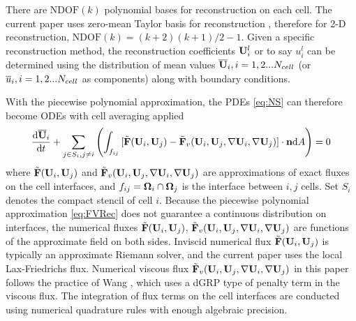 There are $\mathrm{NDOF}(k)$ polynomial bases for reconstruction on
each cell.
The current paper uses zero-mean Taylor basis
for reconstruction \cite{wang2017compact_VR}, therefore
for 2-D reconstruction, $\mathrm{NDOF}(k) = (k+2)(k+1)/2 -1$.
Given a specific reconstruction method,
the reconstruction coefficients $\mathbf{U}_i^l$ or to say $u_i^l$
can be determined using
the distribution of mean values $\overline{\mathbf{U}}_i, i=1,2...N_{cell}$
(or
$\overline{u}_i, i=1,2...N_{cell}$ as components)
along with boundary conditions.

With the piecewise polynomial approximation,
the PDEs \eqref{eq:NS} can therefore become ODEs
with cell averaging applied
\begin{equation}
    \label{eq:FVInt}
    \frac{\dd\overline{\mathbf{U}}_i}{\dd t}
    +\sum_{j\in S_i, j\neq i}{\left(
        \int_{f_{ij}}{
            [\tilde{\mathbf{F}}(\mathbf{U}_i,\mathbf{U}_j) - \tilde{\mathbf{F}}_v(\mathbf{U}_i,\mathbf{U}_j, \nabla \mathbf{U}_i, \nabla \mathbf{U}_j)] \cdot \mathbf{n}  \dd A
        }\right)
    }
    = 0
\end{equation}
where $\tilde{\mathbf{F}}(\mathbf{U}_i,\mathbf{U}_j)$ and $\tilde{\mathbf{F}}_v(\mathbf{U}_i,\mathbf{U}_j, \nabla \mathbf{U}_i, \nabla \mathbf{U}_j)$ are approximations
of exact fluxes on the cell interfaces,
and $f_{ij}=\mathbf{\Omega}_i \cap \mathbf{\Omega}_j$ is the interface between $i,j$ cells.
Set $S_i$ denotes the compact stencil of cell $i$.
Because the piecewise polynomial approximation \eqref{eq:FVRec} does not
guarantee a continuous distribution on interfaces,
the numerical fluxes
$\tilde{\mathbf{F}}(\mathbf{U}_i,\mathbf{U}_j)$, $\tilde{\mathbf{F}}_v(\mathbf{U}_i,\mathbf{U}_j, \nabla \mathbf{U}_i, \nabla \mathbf{U}_j)$ are
functions of the approximate field on both sides.
Inviscid numerical
flux $\tilde{\mathbf{F}}(\mathbf{U}_i,\mathbf{U}_j)$ is typically an approximate Riemann solver,
and the current paper uses the local Lax-Friedrichs flux.
Numerical viscous flux $\tilde{\mathbf{F}}_v(\mathbf{U}_i,\mathbf{U}_j, \nabla \mathbf{U}_i, \nabla \mathbf{U}_j)$
in this paper follows the practice of Wang \cite{wang2017compact_VR},
which uses a dGRP type of penalty term in the viscous flux.
The integration of flux terms on the cell interfaces
are conducted using numerical quadrature rules with
enough algebraic precision.

